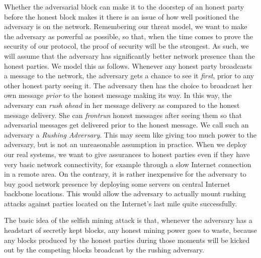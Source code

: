 Whether the adversarial block can make it to the doorstep of an honest party before the
honest block makes it there is an issue of how well positioned the adversary is on the
network. Remembering our threat model, we want to make the adversary as powerful as possible,
so that, when the time comes to prove the security of our protocol, the proof of security
will be the strongest. As such, we will assume that the adversary has significantly better
network presence than the honest parties. We model this as follows. Whenever any honest party
broadcasts a message to the network, the adversary gets a chance to see it \emph{first},
prior to any other honest party seeing it. The adversary then has the choice to broadcast
her own message \emph{prior} to the honest message making its way. In this way, the adversary
can \emph{rush ahead} in her message delivery as compared to the honest message delivery.
She can \emph{frontrun} honest messages after seeing them so that adversarial messages
get delivered prior to the honest message. We call such an adversary a
\emph{Rushing Adversary}. This may seem like giving too much power
to the adversary, but is not an unreasonable assumption in practice. When we deploy our real
systems, we want to give assurances to honest parties even if they have very basic network
connectivity, for example through a slow Internet connection in a remote area. On the contrary,
it is rather inexpensive for the adversary to buy good network presence by deploying some
servers on central Internet backbone locations. This would allow the adversary to actually
mount rushing attacks against parties located on the Internet's last mile quite successfully.


The basic idea of the selfish mining attack is that, whenever the adversary has a headstart of secretly
kept blocks, any honest mining power goes to waste, because any blocks produced by the honest
parties during those moments will be kicked out by the competing blocks broadcast by the rushing
adversary.

